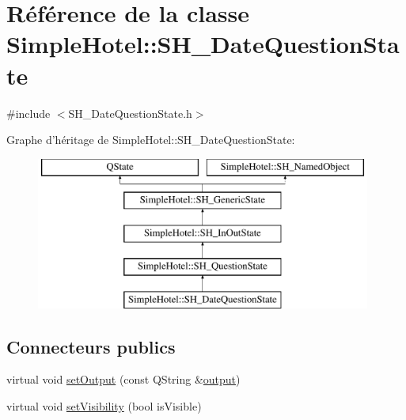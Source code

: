 \hypertarget{classSimpleHotel_1_1SH__DateQuestionState}{\section{Référence de la classe Simple\-Hotel\-:\-:S\-H\-\_\-\-Date\-Question\-State}
\label{classSimpleHotel_1_1SH__DateQuestionState}
}


{\ttfamily \#include $<$S\-H\-\_\-\-Date\-Question\-State.\-h$>$}

Graphe d'héritage de Simple\-Hotel\-:\-:S\-H\-\_\-\-Date\-Question\-State\-:\begin{figure}[H]
\begin{center}
\leavevmode
\includegraphics[height=5.000000cm]{classSimpleHotel_1_1SH__DateQuestionState}
\end{center}
\end{figure}
\subsection*{Connecteurs publics}
\begin{DoxyCompactItemize}
\item 
virtual void \hyperlink{classSimpleHotel_1_1SH__InOutState_a5e151d7b01cceb6766b6d83d4a9ac1aa}{set\-Output} (const Q\-String \&\hyperlink{classSimpleHotel_1_1SH__InOutState_a71b15e4d49b9c2aa540500065ceb39da}{output})
\item 
virtual void \hyperlink{classSimpleHotel_1_1SH__InOutState_a2da1edbe247e9b2661c81c9dc2c7ef8d}{set\-Visibility} (bool is\-Visible)
\end{DoxyCompactItemize}
